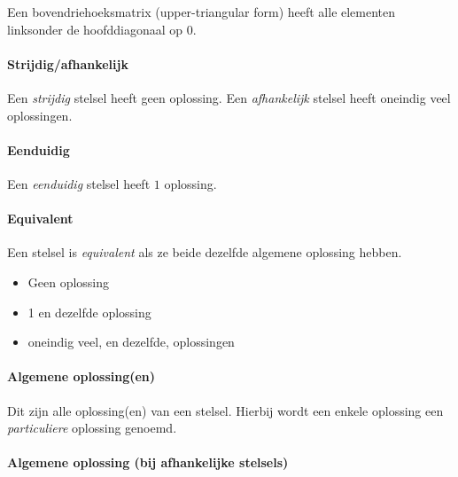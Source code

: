 \documentclass[11pt]{article}
\providecommand{\tightlist}{%
      \setlength{\itemsep}{0pt}\setlength{\parskip}{0pt}}
\begin{document}
    Een bovendriehoeksmatrix (upper-triangular form) heeft alle elementen
linksonder de hoofddiagonaal op \(0\).

    \hypertarget{strijdigafhankelijk}{%
\paragraph{Strijdig/afhankelijk}\label{strijdigafhankelijk}}

    Een \emph{strijdig} stelsel heeft geen oplossing. Een \emph{afhankelijk}
stelsel heeft oneindig veel oplossingen.

    \hypertarget{eenduidig}{%
\paragraph{Eenduidig}\label{eenduidig}}

    Een \emph{eenduidig} stelsel heeft \(1\) oplossing.

    \hypertarget{equivalent}{%
\paragraph{Equivalent}\label{equivalent}}

    Een stelsel is \emph{equivalent} als ze beide dezelfde algemene
oplossing hebben.

\begin{itemize}
\tightlist
\item
  Geen oplossing
\item
  1 en dezelfde oplossing
\item
  oneindig veel, en dezelfde, oplossingen
\end{itemize}

    \hypertarget{algemene-oplossingen}{%
\paragraph{Algemene oplossing(en)}\label{algemene-oplossingen}}

    Dit zijn alle oplossing(en) van een stelsel. Hierbij wordt een enkele
oplossing een \emph{particuliere} oplossing genoemd.

    \hypertarget{algemene-oplossing-bij-afhankelijke-stelsels}{%
\paragraph{Algemene oplossing (bij afhankelijke
stelsels)}\label{algemene-oplossing-bij-afhankelijke-stelsels}}
\end{document}
